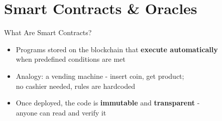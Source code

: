 \documentclass[aspectratio=169, 11pt]{beamer}
\begin{document}
\section{Smart Contracts \& Oracles}

\begin{frame}{What Are Smart Contracts?}
  \begin{itemize}
    \setlength{\itemsep}{12pt}
    \item Programs stored on the blockchain that \textbf{execute automatically}\\
          when predefined conditions are met
    \item Analogy: a \textcolor{ap3orange}{vending machine} - insert coin, get product;\\
          no cashier needed, rules are hardcoded
    \item Once deployed, the code is \textbf{immutable} and \textbf{transparent}  - \\
          anyone can read and verify it
  \end{itemize}

\end{frame}
\end{document}
